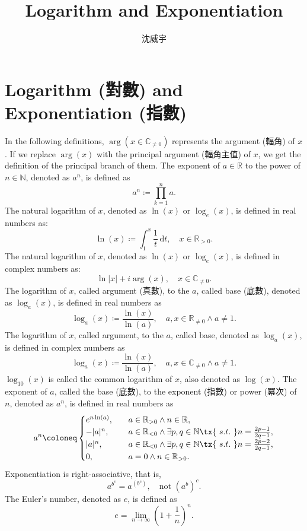 \documentclass[a4paper,12pt]{article}
\begin{document}
\title{Logarithm and Exponentiation}
\author{沈威宇}
\date{\temtoday}
\titletocdoc
\section{Logarithm (對數) and Exponentiation (指數)}
In the following definitions, $\arg(x\in\mathbb{C}_{\neq 0})$ represents the argument (輻角) of $x$. If we replace $\arg(x)$ with the principal argument (輻角主值) of $x$, we get the definition of the principal branch of them.
The exponent of $a\in\mathbb{R}$ to the power of $n\in\mathbb{N}$, denoted as $a^n$, is defined as
\[a^n\coloneq\prod_{k=1}^na.\]
The natural logarithm of $x$, denoted as $\ln(x)$ or $\log_e(x)$, is defined in real numbers as:
\[\ln(x)\coloneq\int_1^x\frac{1}{t}\,\mathrm{d}t,\quad x\in\mathbb{R}_{>0}.\]
The natural logarithm of $x$, denoted as $\ln(x)$ or $\log_e(x)$, is defined in complex numbers as:
\[\ln|x|+i\arg(x),\quad x\in\mathbb{C}_{\neq 0}.\]
The logarithm of $x$, called argument (真數), to the $a$, called base (底數), denoted as $\log_a(x)$, is defined in real numbers as
\[\log_a(x)\coloneq\frac{\ln(x)}{\ln(a)},\quad a,x\in\mathbb{R}_{\neq 0}\land a\neq 1.\]
The logarithm of $x$, called argument, to the $a$, called base, denoted as $\log_a(x)$, is defined in complex numbers as
\[\log_a(x)\coloneq\frac{\ln(x)}{\ln(a)},\quad a,x\in\mathbb{C}_{\neq 0}\land a\neq 1.\]
$\log_{10}(x)$ is called the common logarithm of $x$, also denoted as $\log(x)$.
The exponent of $a$, called the base (底數), to the exponent (指數) or power (冪次) of $n$, denoted as $a^n$, is defined in real numbers as
\[a^n\coloneq\begin{cases}
e^{n\ln(a)},\quad & a\in\mathbb{R}_{>0}\land n\in\mathbb{R},\\
-|a|^n,\quad & a\in\mathbb{R}_{<0}\land \exists p,q\in\mathbb{N}\tx{\ s.t.\ } n=\frac{2p-1}{2q-1},\\
|a|^n,\quad & a\in\mathbb{R}_{<0}\land \exists p,q\in\mathbb{N}\tx{\ s.t.\ } n=\frac{2p-2}{2q-1},\\
0,\quad & a=0\land n\in\mathbb{R}_{>0}.
\end{cases}\]
Exponentiation is right-associative, that is,
\[a^{b^{c}} = a^{(b^{c})}, \quad \text{not\ } (a^b)^c.\]
The Euler's number, denoted as $e$, is defined as
\[e=\lim_{n\to\infty}\left(1+\frac{1}{n}\right)^n.\]
\end{document}
